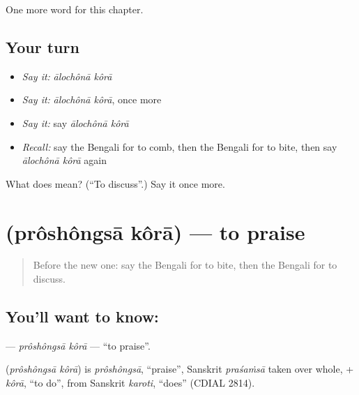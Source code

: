 \begin{grammarlens}[title={What you've built}]
One more word for this chapter.
\end{grammarlens}

\subsection*{Your turn}
\begin{itemize}
\raggedright
  \item \emph{Say it:} \emph{ālochônā kôrā}
  \item \emph{Say it:} \emph{ālochônā kôrā}, once more
  \item \emph{Say it:} say \emph{ālochônā kôrā}
  \item \emph{Recall:} say the Bengali for to comb, then the Bengali for to bite, then say \emph{ālochônā kôrā} again
\end{itemize}

\begin{tcolorbox}[breakable,colback=teal!4,colframe=teal!35!black,title={Before you move on}]
What does   mean? (\textquotedblleft{}To discuss\textquotedblright{}.) Say it once more.
\end{tcolorbox}
\section[\texorpdfstring{\bn{প্রশংসা} \bn{করা} (prôshôngsā kôrā)}{প্রশংসা করা (prôshôngsā kôrā)}]{  (prôshôngsā kôrā) — to praise}

\label{lesson:BN-C153-proshongsa-kora}



\begin{quote}
Before the new one: say the Bengali for to bite, then the Bengali for to discuss.
\end{quote}

\subsection*{You'll want to know:  }
\textbf{ } — \emph{prôshôngsā kôrā} — \textquotedblleft{}to praise\textquotedblright{}.

\begin{cousinweb}
\textbf{ } (\emph{prôshôngsā kôrā}) is \emph{prôshôngsā}, \textquotedblleft{}praise\textquotedblright{}, Sanskrit \emph{praśaṁsā} taken over whole, + \emph{kôrā}, \textquotedblleft{}to do\textquotedblright{}, from Sanskrit \emph{karoti}, \textquotedblleft{}does\textquotedblright{} (CDIAL 2814).
\end{cousinweb}

